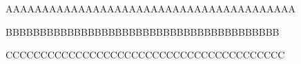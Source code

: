 	
	

\begin{newpdflayout}{210mm}{297mm}%

AAAAAAAAAAAAAAAAAAAAAAAAAAAAAAAAAAAAAAAA


BBBBBBBBBBBBBBBBBBBBBBBBBBBBBBBBBBBBBBBB
\end{newpdflayout}

CCCCCCCCCCCCCCCCCCCCCCCCCCCCCCCCCCCCCCCC

